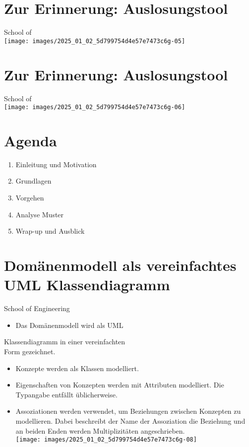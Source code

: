 \documentclass[10pt]{article}
\begin{document}
\section*{Zur Erinnerung: Auslosungstool}
School of\\
\texttt{[image: images/2025\_01\_02\_5d799754d4e57e7473c6g-05]}

\section*{Zur Erinnerung: Auslosungstool}
School of\\
\texttt{[image: images/2025\_01\_02\_5d799754d4e57e7473c6g-06]}

\section*{Agenda}
\begin{enumerate}
  \item Einleitung und Motivation
  \item Grundlagen
  \item Vorgehen
  \item Analyse Muster
  \item Wrap-up und Ausblick
\end{enumerate}

\section*{Domänenmodell als vereinfachtes UML Klassendiagramm}
School of Engineering

\begin{itemize}
  \item Das Domänenmodell wird als UML
\end{itemize}

Klassendiagramm in einer vereinfachten\\
Form gezeichnet.

\begin{itemize}
  \item Konzepte werden als Klassen modelliert.
  \item Eigenschaften von Konzepten werden mit Attributen modelliert. Die Typangabe entfällt üblicherweise.
  \item Assoziationen werden verwendet, um Beziehungen zwischen Konzepten zu modellieren. Dabei beschreibt der Name der Assoziation die Beziehung und an beiden Enden werden Multiplizitäten angeschrieben.\\
\texttt{[image: images/2025\_01\_02\_5d799754d4e57e7473c6g-08]}
\end{itemize}
\end{document}
